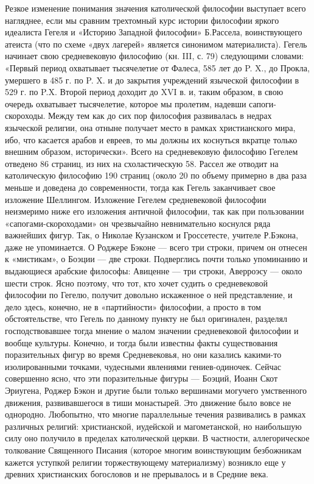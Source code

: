 Резкое изменение понимания значения католической философии выступает
всего нагляднее, если мы сравним трехтомный курс истории философии
яркого идеалиста Гегеля и «Историю Западной философии» Б.Рассела,
воинствующего атеиста (что по схеме «двух лагерей» является синонимом
материалиста). Гегель начинает свою средневековую философию (кн. III,
с. 79) следующими словами: «Первый период охватывает тысячелетие от
Фалеса, 585 лет до P. X., до Прокла, умершего в 485 г. по P. X. и до
закрытия учреждений языческой философии в 529 г. по P.X. Второй
период доходит до XVI в. и, таким образом, в свою очередь охватывает
тысячелетие, которое мы пролетим, надевши сапоги-скороходы. Между тем
как до сих пор философия развивалась в недрах языческой религии, она
отныне получает место в рамках христианского мира, ибо, что касается
арабов и евреев, то мы должны их коснуться вкратце только внешним
образом, исторически». Всего на средневековую философию Гегелем
отведено 86 страниц, из них на схоластическую 58. Рассел же отводит на
католическую философию 190 страниц (около 20%
по объему примерно в два раза меньше и доведена до современности,
тогда как Гегель заканчивает свое изложение Шеллингом. Изложение
Гегелем средневековой философии неизмеримо ниже его изложения античной
философии, так как при пользовании «сапогами-скороходами» он
чрезвычайно невнимательно коснулся ряда важнейших фигур. Так, о
Николае Кузанском и Гроссетесте, учителе Р.Бэкона, даже не
упоминается. О Роджере Бэконе --- всего три строки, причем он отнесен
к «мистикам», о Боэции --- две строки. Подверглись почти только
упоминанию и выдающиеся арабские философы: Авиценне --- три строки,
Аверроэсу --- около шести строк. Ясно поэтому, что тот, кто хочет
судить о средневековой философии по Гегелю, получит довольно
искаженное о ней представление, и дело здесь, конечно, не в
«партийности» философии, а просто в том обстоятельстве, что Гегель по
данному пункту не был оригинален, разделял господствовавшее тогда
мнение о малом значении средневековой философии и вообще культуры.
Конечно, и тогда были известны факты существования поразительных фигур
во время Средневековья, но они казались какими-то изолированными
точками, чудесными явлениями гениев-одиночек. Сейчас совершенно ясно,
что эти поразительные фигуры --- Боэций, Иоанн Скот Эриугена, Роджер
Бэкон и другие были только вершинами могучего умственного движения,
развивавшегося в тиши монастырей. Это движение было вовсе не
однородно. Любопытно, что многие параллельные течения развивались в
рамках различных религий: христианской, иудейской и магометанской, но
наибольшую силу оно получило в пределах католической церкви. В
частности, аллегорическое толкование Священного Писания (которое
многим воинствующим безбожникам кажется уступкой религии
торжествующему материализму) возникло еще у древних христианских
богословов и не прерывалось и в Средние века.

